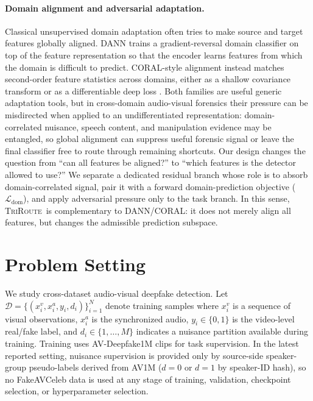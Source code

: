 \documentclass{article}
\newcommand{\method}{\textsc{TriRoute}}
\begin{document}
\paragraph{Domain alignment and adversarial adaptation.}
Classical unsupervised domain adaptation often tries to make source and target features globally aligned. DANN \citep{ganin2016dann} trains a gradient-reversal domain classifier on top of the feature representation so that the encoder learns features from which the domain is difficult to predict. CORAL-style alignment instead matches second-order feature statistics across domains, either as a shallow covariance transform or as a differentiable deep loss \citep{sun2016deepcoral}. Both families are useful generic adaptation tools, but in cross-domain audio-visual forensics their pressure can be misdirected when applied to an undifferentiated representation: domain-correlated nuisance, speech content, and manipulation evidence may be entangled, so global alignment can suppress useful forensic signal or leave the final classifier free to route through remaining shortcuts. Our design changes the question from ``can all features be aligned?'' to ``which features is the detector allowed to use?'' We separate a dedicated residual branch whose role is to absorb domain-correlated signal, pair it with a forward domain-prediction objective ($\mathcal{L}_{\mathrm{dom}}$), and apply adversarial pressure only to the task branch. In this sense, \method\ is complementary to DANN/CORAL: it does not merely align all features, but changes the admissible prediction subspace.

\section{Problem Setting}

We study cross-dataset audio-visual deepfake detection. Let $\mathcal{D} = \{(x_i^v, x_i^a, y_i, d_i)\}_{i=1}^N$ denote training samples where $x_i^v$ is a sequence of visual observations, $x_i^a$ is the synchronized audio, $y_i \in \{0,1\}$ is the video-level real/fake label, and $d_i \in \{1,\dots,M\}$ indicates a nuisance partition available during training. Training uses AV-Deepfake1M clips for task supervision. In the latest reported setting, nuisance supervision is provided only by source-side speaker-group pseudo-labels derived from AV1M ($d=0$ or $d=1$ by speaker-ID hash), so no FakeAVCeleb data is used at any stage of training, validation, checkpoint selection, or hyperparameter selection.
\end{document}
